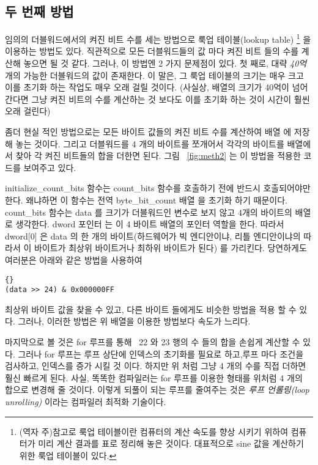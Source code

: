\subsection{두 번째 방법}

임의의 더블워드에서의 켜진 비트 수를 세는 방법으로 룩업 테이블(lookup table) 
\footnote{(역자 주)참고로 룩업 테이블이란 컴퓨터의 계산 속도를 향상
시키기 위하여 컴퓨터가 미리 계산 결과를 표로 정리해 놓은 것이다. 대표적으로
sine 값을 계산하기 위한 룩업 테이블이 있다.} 을 이용하는 방법도 있다. 
직관적으로 모든 더블워드들의 값 마다 켜진 비트 들의 수를 계산해 놓으면
될 것 같다. 그러나, 이 방법엔 2 가지 문제점이 있다. 첫 째로, 대략 \emph{40억}
개의 가능한 더블워드의 값이 존재한다. 이 말은, 그 룩업 테이블의 크기는
매우 크고 이를 초기화 하는 작업도 매우 오래 걸릴 것이다. (사실상, 배열의
크기가 40억이 넘어간다면 그냥 켜진 비트의 수를 계산하는 것 보다도 이를 
초기화 하는 것이 시간이 훨씬 오래 걸린다) 

좀더 현실 적인 방법으로는 모든 바이트 값들의 켜진 비트 수를 계산하여 배열
에 저장해 놓는 것이다. 그리고 더블워드를 4 개의 바이트를 쪼개어서 각각의
바이트를 배열에서 찾아 각 켜진 비트들의 합을 더한면 된다. 그림 ~\ref{fig:meth2}
는 이 방법을 적용한 코드를 보여주고 있다. 

{\code initialize\_count\_bits} 함수는 {\code count\_bits} 함수를 호출하기 전에
반드시 호출되어야만 한다. 왜냐하면 이 함수는 전역 {\code byte\_bit\_count} 배열
을 초기화 하기 때문이다. {\code count\_bits} 함수는 {\code data} 를 크기가
더블워드인 변수로 보지 않고 4개의 바이트의 배열로 생각한다. {\code dword} 포인터
는 이 4 바이트 배열의 포인터 역할을 한다. 따라서 {\code dword[0]} 은 {\code data}
의 한 개의 바이트(하드웨어가 빅 엔디안이냐, 리틀 엔디안이냐의 따라서 이 바이트가
최상위 바이트거나 최하위 바이트가 된다) 를 가리킨다. 당연하게도 여러분은
아래와 같은 방법을 사용하여 

\begin{lstlisting}[stepnumber=0]{}
(data >> 24) & 0x000000FF
\end{lstlisting}
\noindent 최상위 바이트 값을 찾을 수 있고, 다른 바이트 들에게도 비슷한 방법을
적용 할 수 있다. 그러나, 이러한 방법은 위 배열을 이용한 방법보다 속도가
느리다. 

마지막으로 볼 것은 {\code for} 루프를 통해 ~22 와 23 행의 수 들의 합을 손쉽게 계산할
수 있다. 그러나 {\code for} 루프는 루프 상단에 인덱스의 초기화를 필요로 하고,루프 마다
조건을 검사하고, 인덱스를 증가 시킬 것 이다. 하지만 위 처럼 그냥 4 개의 수를
직접 더하면 훨신 빠르게 된다. 사실, 똑똑한 컴파일러는 {\code for} 루프를 이용한 
형태를 위처럼 4 개의 합으로 변경해 줄 것이다. 이렇게 되풀이 되는 루프를 줄여주는
것은 \emph{루프 언롤링(loop unrolling)} 이라는 컴파일러 최적화 기술이다. 

